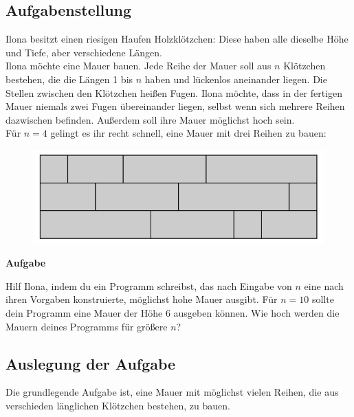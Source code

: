 \documentclass[a4paper,12pt]{article}
\begin{document}
\subsection{Aufgabenstellung}
Ilona besitzt einen riesigen Haufen Holzklötzchen: Diese haben alle dieselbe Höhe und Tiefe,
aber verschiedene Längen. \\
Ilona möchte eine Mauer bauen. Jede Reihe der Mauer soll aus $n$ Klötzchen bestehen, die die
Längen 1 bis $n$ haben und lückenlos aneinander liegen. Die Stellen zwischen den Klötzchen heißen
Fugen. Ilona möchte, dass in der fertigen Mauer niemals zwei Fugen übereinander liegen,
selbst wenn sich mehrere Reihen dazwischen befinden. Außerdem soll ihre Mauer möglichst
hoch sein. \\
Für $n = 4$ gelingt es ihr recht schnell, eine Mauer mit drei Reihen zu bauen:
\begin{figure}[H]
    \includegraphics[width=0.7\linewidth]{Bilder/Aufgabe1/Aufgabenstellung_BeispielMauer.png}
\end{figure}
\begin{large}
    \textbf{Aufgabe} \\
\end{large}
Hilf Ilona, indem du ein Programm schreibst, das nach Eingabe von $n$ eine nach ihren Vorgaben
konstruierte, möglichst hohe Mauer ausgibt. Für $n = 10$ sollte dein Programm eine Mauer der
Höhe 6 ausgeben können. Wie hoch werden die Mauern deines Programms für größere $n$?

\subsection{Auslegung der Aufgabe}
Die grundlegende Aufgabe ist, eine Mauer mit möglichst vielen Reihen, die aus verschieden länglichen Klötzchen bestehen, zu bauen.
\end{document}
